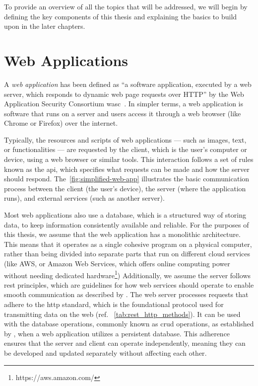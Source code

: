 
To provide an overview of all the topics that will be addressed, we will begin by defining the key components of this thesis and explaining the basics to build upon in the later chapters. 

\section{Web Applications}
\label{sec:webapp}
A \textit{web application} has been defined as “a software application, executed by a web server, which responds to dynamic web page requests over HTTP” by the Web Application Security Consortium \gls{wasc}~\cite{noauthor_web_2012}. 
In simpler terms, a web application is software that runs on a server and users access it through a web browser (like Chrome or Firefox) over the internet.

Typically, the resources and scripts of web applications — such as images, text, or functionalities — are requested by the client, which is the user's computer or device, using a web browser or similar tools. This interaction follows a set of rules known as the \gls{api}, which specifies what requests can be made and how the server should respond.
The~\autoref{fig:simplified-web-app} illustrates the basic communication process between the client (the user's device), the server (where the application runs), and external services (such as another server).

Most web applications also use a database, which is a structured way of storing data, to keep information consistently available and reliable. For the purposes of this thesis, we assume that the web application has a monolithic architecture. This means that it operates as a single cohesive program on a physical computer, rather than being divided into separate parts that run on different cloud services (like AWS, or Amazon Web Services, which offers online computing power without needing dedicated hardware\footnote{https://aws.amazon.com/})
Additionally, we assume the server follows \gls{rest} principles, which are guidelines for how web services should operate to enable smooth communication as described by \citet{roy_t_fielding_rest_2008}. 
The web server processes requests that adhere to the \gls{http} standard, which is the foundational protocol used for transmitting data on the web (ref. ~\autoref{tab:rest_http_methods}). It can be used  with the database operations, commonly known as \gls{crud} operations, as established by \citet{martin_managing_1983}, when a web application utilizes a persistent database.
This adherence ensures that the server and client can operate independently, meaning they can be developed and updated separately without affecting each other\cite{fielding_http_2022}.


